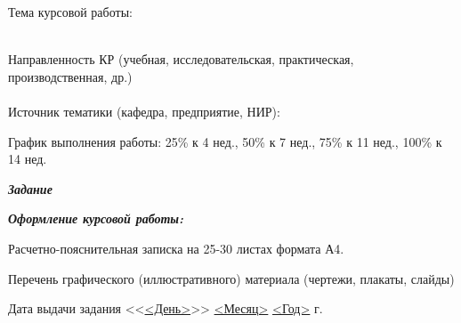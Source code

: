 \documentclass[utf8x, 11pt, oneside, a4paper]{article}
\begin{document}
	\begin{flushleft}
		Тема курсовой работы: \uline{ \hfill}
		\\ \uline{ \hfill}
		\\ \uline{ \hfill}
	\end{flushleft}

	\begin{flushleft}
		Направленность КР (учебная, исследовательская, практическая, производственная, др.)
		\\ \uline{\hfill}
		\\ Источник тематики (кафедра, предприятие, НИР): \uline{\hfill}
	\end{flushleft}

	\begin{flushleft}
		График выполнения работы:  25\% к 4 нед., 50\% к 7 нед., 75\% к 11 нед., 100\% к 14 нед.
	\end{flushleft}

	\begin{flushleft}
		\textbf{\textit{Задание}} \uline{\hfill}
		
		\uline{\hfill}
		
		\uline{\hfill}

		\uline{\hfill}

		\uline{\hfill}
	\end{flushleft}

	\begin{flushleft}
		\textbf{\textit{Оформление курсовой работы:}}
		
		Расчетно-пояснительная записка на 25-30 листах формата А4.

		Перечень графического (иллюстративного) материала (чертежи, плакаты, слайды)
		
		\uline{\hfill}

		\uline{\hfill}

		\uline{\hfill}

		\uline{\hfill}
	\end{flushleft}

	\begin{flushleft}
		Дата выдачи задания <<\uline{<День>}>> \uline{<Месяц>} \uline{<Год>} г.
	\end{flushleft}
\end{document}
